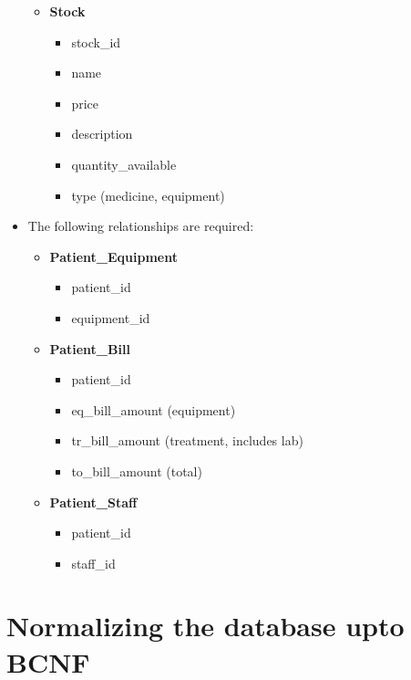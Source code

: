 \documentclass{article}
\begin{document}
\begin{itemize}
\begin{itemize}
\begin{itemize}
                \end{itemize}
            \item \textbf{Stock}
                \begin{itemize}
                    \item {\color{blue}stock\_id}
                    \item name
                    \item price
                    \item description
                    \item quantity\_available
                    \item type (medicine, equipment)
                \end{itemize}
        \end{itemize}
    \item The following relationships are required:
        \begin{itemize}
            \item \textbf{Patient\_Equipment}
                \begin{itemize}
                    \item {\color{blue}patient\_id}
                    \item {\color{blue}equipment\_id}
                \end{itemize}
            \item \textbf{Patient\_Bill}
                \begin{itemize}
                    \item {\color{blue}patient\_id}
                    \item eq\_bill\_amount (equipment)
                    \item tr\_bill\_amount (treatment, includes lab)
                    \item to\_bill\_amount (total)
                \end{itemize}
            \item \textbf{Patient\_Staff}
                \begin{itemize}
                    \item {\color{blue}patient\_id}
                    \item {\color{blue}staff\_id}
                \end{itemize}
        \end{itemize}
\end{itemize}

\section{Normalizing the database upto BCNF}
\end{document}
